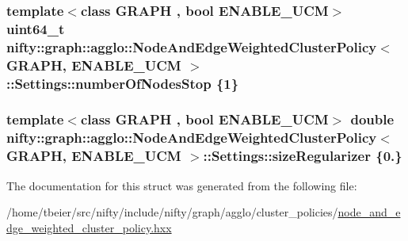 \subsubsection[{number\+Of\+Nodes\+Stop}]{\setlength{\rightskip}{0pt plus 5cm}template$<$class G\+R\+A\+P\+H , bool E\+N\+A\+B\+L\+E\+\_\+\+U\+C\+M$>$ uint64\+\_\+t {\bf nifty\+::graph\+::agglo\+::\+Node\+And\+Edge\+Weighted\+Cluster\+Policy}$<$ G\+R\+A\+P\+H, E\+N\+A\+B\+L\+E\+\_\+\+U\+C\+M $>$\+::Settings\+::number\+Of\+Nodes\+Stop \{1\}}\label{structnifty_1_1graph_1_1agglo_1_1NodeAndEdgeWeightedClusterPolicy_1_1Settings_ab3b377a180a3c360250ac6d851758065}
\hypertarget{structnifty_1_1graph_1_1agglo_1_1NodeAndEdgeWeightedClusterPolicy_1_1Settings_a051fc6fd53c6f43f933dd88b025aaf3e}{}
\subsubsection[{size\+Regularizer}]{\setlength{\rightskip}{0pt plus 5cm}template$<$class G\+R\+A\+P\+H , bool E\+N\+A\+B\+L\+E\+\_\+\+U\+C\+M$>$ double {\bf nifty\+::graph\+::agglo\+::\+Node\+And\+Edge\+Weighted\+Cluster\+Policy}$<$ G\+R\+A\+P\+H, E\+N\+A\+B\+L\+E\+\_\+\+U\+C\+M $>$\+::Settings\+::size\+Regularizer \{0.\}}\label{structnifty_1_1graph_1_1agglo_1_1NodeAndEdgeWeightedClusterPolicy_1_1Settings_a051fc6fd53c6f43f933dd88b025aaf3e}


The documentation for this struct was generated from the following file\+:\begin{DoxyCompactItemize}
\item 
/home/tbeier/src/nifty/include/nifty/graph/agglo/cluster\+\_\+policies/\hyperlink{node__and__edge__weighted__cluster__policy_8hxx}{node\+\_\+and\+\_\+edge\+\_\+weighted\+\_\+cluster\+\_\+policy.\+hxx}\end{DoxyCompactItemize}
